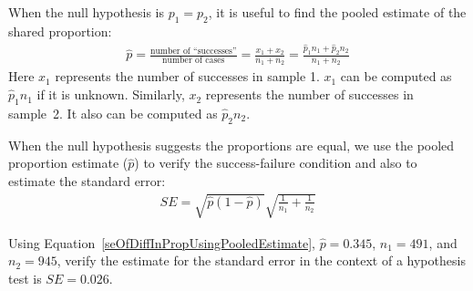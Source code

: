 \begin{termBox}{
When the null hypothesis is $p_1 = p_2$, it is useful to find the pooled estimate of the shared proportion:
\begin{eqnarray*}
\hat{p} = \frac{\text{number of ``successes''}}{\text{number of cases}} = \frac{x_1+x_2}{n_1+n_2}=\frac{\hat{p}_1n_1 + \hat{p}_2n_2}{n_1 + n_2}
\end{eqnarray*}
Here $x_1$ represents the number of successes in sample 1. $x_1$ can be computed as $\hat{p}_1n_1$ if it is unknown. Similarly, $x_2$ represents the number of successes in sample~2. It also can be computed as $\hat{p}_2n_2$.}
\end{termBox}

\begin{tipBox}{
When the null hypothesis suggests the proportions are equal, we use the pooled proportion estimate ($\hat{p}$) to verify the success-failure condition and also to estimate the standard error:
\begin{eqnarray}
SE =\sqrt{\hat{p}(1-\hat{p})}\sqrt{\frac{1}{n_1} + \frac{1}{n_2}}
\label{seOfDiffInPropUsingPooledEstimate}
\end{eqnarray}}
\end{tipBox}

\begin{exercise}\label{verifySEOfPooledEstimateOf24DWithCancerNoCancerDogs}
Using Equation~\eqref{seOfDiffInPropUsingPooledEstimate}, $\hat{p}=0.345$, $n_1 = 491$, and $n_2=945$, verify the estimate for the standard error in the context of a hypothesis test is $SE = 0.026$.
\end{exercise}

